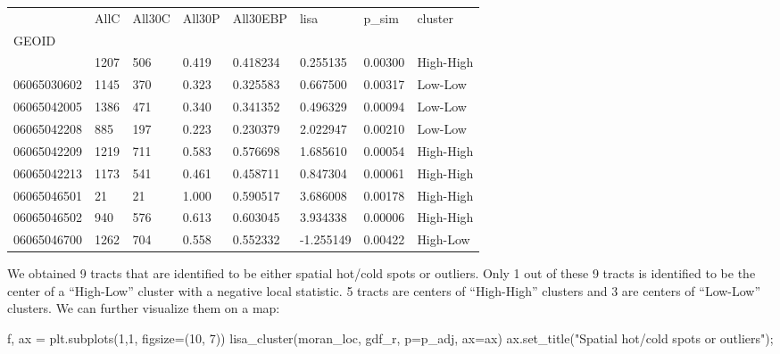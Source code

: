 \documentclass[
]{aft}
\newenvironment{Shaded}{\begin{snugshade}}{\end{snugshade}}
\newcommand{\DecValTok}[1]{\textcolor[rgb]{0.68,0.00,0.00}{#1}}
\newcommand{\NormalTok}[1]{\textcolor[rgb]{0.00,0.23,0.31}{#1}}
\newcommand{\OperatorTok}[1]{\textcolor[rgb]{0.37,0.37,0.37}{#1}}
\newcommand{\StringTok}[1]{\textcolor[rgb]{0.13,0.47,0.30}{#1}}
\begin{document}
\begin{longtable}[]{@{}llllllll@{}}
\toprule\noalign{}
& AllC & All30C & All30P & All30EBP & lisa & p\_sim & cluster \\
GEOID & & & & & & & \\
\midrule\noalign{}
\endhead
\bottomrule\noalign{}
\endlastfoot
06065030501 & 1207 & 506 & 0.419 & 0.418234 & 0.255135 & 0.00300 &
High-High \\
06065030602 & 1145 & 370 & 0.323 & 0.325583 & 0.667500 & 0.00317 &
Low-Low \\
06065042005 & 1386 & 471 & 0.340 & 0.341352 & 0.496329 & 0.00094 &
Low-Low \\
06065042208 & 885 & 197 & 0.223 & 0.230379 & 2.022947 & 0.00210 &
Low-Low \\
06065042209 & 1219 & 711 & 0.583 & 0.576698 & 1.685610 & 0.00054 &
High-High \\
06065042213 & 1173 & 541 & 0.461 & 0.458711 & 0.847304 & 0.00061 &
High-High \\
06065046501 & 21 & 21 & 1.000 & 0.590517 & 3.686008 & 0.00178 &
High-High \\
06065046502 & 940 & 576 & 0.613 & 0.603045 & 3.934338 & 0.00006 &
High-High \\
06065046700 & 1262 & 704 & 0.558 & 0.552332 & -1.255149 & 0.00422 &
High-Low \\
\end{longtable}

We obtained 9 tracts that are identified to be either spatial hot/cold
spots or outliers. Only 1 out of these 9 tracts is identified to be the
center of a ``High-Low'' cluster with a negative local statistic. 5
tracts are centers of ``High-High'' clusters and 3 are centers of
``Low-Low'' clusters. We can further visualize them on a map:

\begin{Shaded}
\begin{Highlighting}[]
\NormalTok{f, ax }\OperatorTok{=}\NormalTok{ plt.subplots(}\DecValTok{1}\NormalTok{,}\DecValTok{1}\NormalTok{, figsize}\OperatorTok{=}\NormalTok{(}\DecValTok{10}\NormalTok{, }\DecValTok{7}\NormalTok{))}
\NormalTok{lisa\_cluster(moran\_loc, gdf\_r, p}\OperatorTok{=}\NormalTok{p\_adj, ax}\OperatorTok{=}\NormalTok{ax)}
\NormalTok{ax.set\_title(}\StringTok{"Spatial hot/cold spots or outliers"}\NormalTok{)}\OperatorTok{;}
\end{Highlighting}
\end{Shaded}
\end{document}

